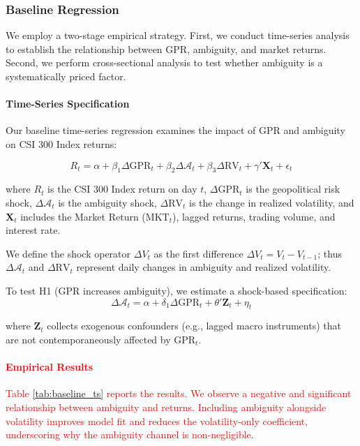 \documentclass[preprint,12pt,authoryear]{elsarticle}
\begin{document}
\subsubsection{Baseline Regression}

We employ a two-stage empirical strategy. First, we conduct time-series analysis to establish the relationship between GPR, ambiguity, and market returns. Second, we perform cross-sectional analysis to test whether ambiguity is a systematically priced factor.

\paragraph{Time-Series Specification}
Our baseline time-series regression examines the impact of GPR and ambiguity on CSI 300 Index returns:

\begin{equation}
R_{t} = \alpha + \beta_1 \Delta \text{GPR}_{t} + \beta_2 \Delta \mathcal{A}_{t} + \beta_3 \Delta \text{RV}_{t} + \gamma' \mathbf{X}_{t} + \epsilon_{t}
\end{equation}

where $R_t$ is the CSI 300 Index return on day $t$, $\Delta \text{GPR}_t$ is the geopolitical risk shock, $\Delta \mathcal{A}_t$ is the ambiguity shock, $\Delta \text{RV}_t$ is the change in realized volatility, and $\mathbf{X}_t$ includes the Market Return ($\text{MKT}_t$), lagged returns, trading volume, and interest rate.

We define the shock operator $\Delta V_t$ as the first difference $\Delta V_t = V_t - V_{t-1}$; thus $\Delta \mathcal{A}_t$ and $\Delta \text{RV}_t$ represent daily changes in ambiguity and realized volatility.

To test H1 (GPR increases ambiguity), we estimate a shock-based specification:
\begin{equation}
\Delta \mathcal{A}_{t} = \alpha + \delta_1 \Delta \text{GPR}_{t} + \theta' \mathbf{Z}_{t} + \eta_{t}
\end{equation}

where $\mathbf{Z}_t$ collects exogenous confounders (e.g., lagged macro instruments) that are not contemporaneously affected by $\text{GPR}_t$.

\paragraph{\textcolor{red}{Empirical Results}}
\textcolor{red}{Table \ref{tab:baseline_ts} reports the results. We observe a negative and significant relationship between ambiguity and returns. Including ambiguity alongside volatility improves model fit and reduces the volatility-only coefficient, underscoring why the ambiguity channel is non-negligible.}
\end{document}
